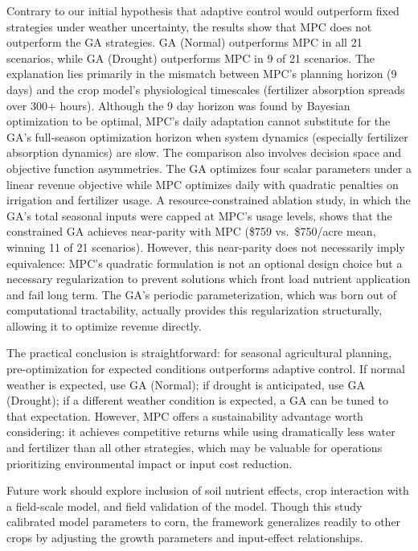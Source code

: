 \documentclass[pdflatex,sn-mathphys-num]{sn-jnl}
\begin{document}
Contrary to our initial hypothesis that adaptive control would outperform fixed strategies under weather uncertainty, the results show that MPC does not outperform the GA strategies. GA (Normal) outperforms MPC in all 21 scenarios, while GA (Drought) outperforms MPC in 9 of 21 scenarios. The explanation lies primarily in the mismatch between MPC's planning horizon (9 days) and the crop model's physiological timescales (fertilizer absorption spreads over 300+ hours). Although the 9 day horizon was found by Bayesian optimization to be optimal, MPC's daily adaptation cannot substitute for the GA's full-season optimization horizon when system dynamics (especially fertilizer absorption dynamics) are slow. The comparison also involves decision space and objective function asymmetries. The GA optimizes four scalar parameters under a linear revenue objective while MPC optimizes daily with quadratic penalties on irrigation and fertilizer usage. A resource-constrained ablation study, in which the GA's total seasonal inputs were capped at MPC's usage levels, shows that the constrained GA achieves near-parity with MPC (\$759 vs.\ \$750/acre mean, winning 11 of 21 scenarios). However, this near-parity does not necessarily imply equivalence: MPC's quadratic formulation is not an optional design choice but a necessary regularization to prevent solutions which front load nutrient application and fail long term. The GA's periodic parameterization, which was born out of computational tractability, actually provides this regularization structurally, allowing it to optimize revenue directly.

The practical conclusion is straightforward: for seasonal agricultural planning, pre-optimization for expected conditions outperforms adaptive control. If normal weather is expected, use GA (Normal); if drought is anticipated, use GA (Drought); if a different weather condition is expected, a GA can be tuned to that expectation. However, MPC offers a sustainability advantage worth considering: it achieves competitive returns while using dramatically less water and fertilizer than all other strategies, which may be valuable for operations prioritizing environmental impact or input cost reduction.

Future work should explore inclusion of soil nutrient effects, crop interaction with a field-scale model, and field validation of the model. Though this study calibrated model parameters to corn, the framework generalizes readily to other crops by adjusting the growth parameters and input-effect relationships.
\end{document}
